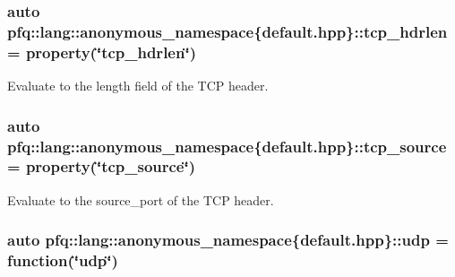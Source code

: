 \subsubsection[{\texorpdfstring{tcp\+\_\+hdrlen}{tcp_hdrlen}}]{\setlength{\rightskip}{0pt plus 5cm}auto pfq\+::lang\+::anonymous\+\_\+namespace\{default.\+hpp\}\+::tcp\+\_\+hdrlen = {\bf property}(\char`\"{}tcp\+\_\+hdrlen\char`\"{})}\hypertarget{namespacepfq_1_1lang_1_1anonymous__namespace_02default_8hpp_03_a678163384b58e4682bdbaf7efdd22cfb}{}\label{namespacepfq_1_1lang_1_1anonymous__namespace_02default_8hpp_03_a678163384b58e4682bdbaf7efdd22cfb}


Evaluate to the {\ttfamily length} field of the T\+CP header. 

\subsubsection[{\texorpdfstring{tcp\+\_\+source}{tcp_source}}]{\setlength{\rightskip}{0pt plus 5cm}auto pfq\+::lang\+::anonymous\+\_\+namespace\{default.\+hpp\}\+::tcp\+\_\+source = {\bf property}(\char`\"{}tcp\+\_\+source\char`\"{})}\hypertarget{namespacepfq_1_1lang_1_1anonymous__namespace_02default_8hpp_03_a367a9ec6d91677553073c54a059b391d}{}\label{namespacepfq_1_1lang_1_1anonymous__namespace_02default_8hpp_03_a367a9ec6d91677553073c54a059b391d}


Evaluate to the {\ttfamily source\+\_\+port} of the T\+CP header. 

\subsubsection[{\texorpdfstring{udp}{udp}}]{\setlength{\rightskip}{0pt plus 5cm}auto pfq\+::lang\+::anonymous\+\_\+namespace\{default.\+hpp\}\+::udp = {\bf function}(\char`\"{}udp\char`\"{})}\hypertarget{namespacepfq_1_1lang_1_1anonymous__namespace_02default_8hpp_03_a0b8b927aad3be7034521ebde0dabf7d3}{}\label{namespacepfq_1_1lang_1_1anonymous__namespace_02default_8hpp_03_a0b8b927aad3be7034521ebde0dabf7d3}


